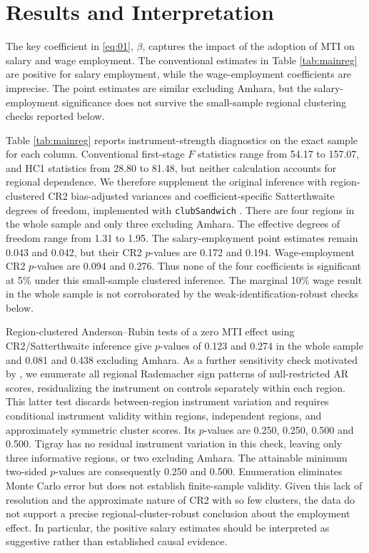 
\section{Results and Interpretation}
\label{section:results}


The key coefficient in \eqref{eq:01}, $ \beta $, captures the impact of the adoption of MTI on salary and wage employment. The conventional estimates in Table \ref{tab:mainreg} are positive for salary employment, while the wage-employment coefficients are imprecise. The point estimates are similar excluding Amhara, but the salary-employment significance does not survive the small-sample regional clustering checks reported below.

Table \ref{tab:mainreg} reports instrument-strength diagnostics on the exact sample for each column. Conventional first-stage $F$ statistics range from 54.17 to 157.07, and HC1 statistics from 28.80 to 81.48, but neither calculation accounts for regional dependence. We therefore supplement the original inference with region-clustered CR2 bias-adjusted variances and coefficient-specific Satterthwaite degrees of freedom, implemented with \texttt{clubSandwich} \citep{PustejovskyTipton2018}. There are four regions in the whole sample and only three excluding Amhara. The effective degrees of freedom range from 1.31 to 1.95. The salary-employment point estimates remain 0.043 and 0.042, but their CR2 $p$-values are 0.172 and 0.194. Wage-employment CR2 $p$-values are 0.094 and 0.276. Thus none of the four coefficients is significant at 5\% under this small-sample clustered inference. The marginal 10\% wage result in the whole sample is not corroborated by the weak-identification-robust checks below.

Region-clustered Anderson--Rubin tests of a zero MTI effect using CR2/Satterthwaite inference give $p$-values of 0.123 and 0.274 in the whole sample and 0.081 and 0.438 excluding Amhara. As a further sensitivity check motivated by \citet{WangZhang2024}, we enumerate all regional Rademacher sign patterns of null-restricted AR scores, residualizing the instrument on controls separately within each region. This latter test discards between-region instrument variation and requires conditional instrument validity within regions, independent regions, and approximately symmetric cluster scores. Its $p$-values are 0.250, 0.250, 0.500 and 0.500. Tigray has no residual instrument variation in this check, leaving only three informative regions, or two excluding Amhara. The attainable minimum two-sided $p$-values are consequently 0.250 and 0.500. Enumeration eliminates Monte Carlo error but does not establish finite-sample validity. Given this lack of resolution and the approximate nature of CR2 with so few clusters, the data do not support a precise regional-cluster-robust conclusion about the employment effect. In particular, the positive salary estimates should be interpreted as suggestive rather than established causal evidence.

